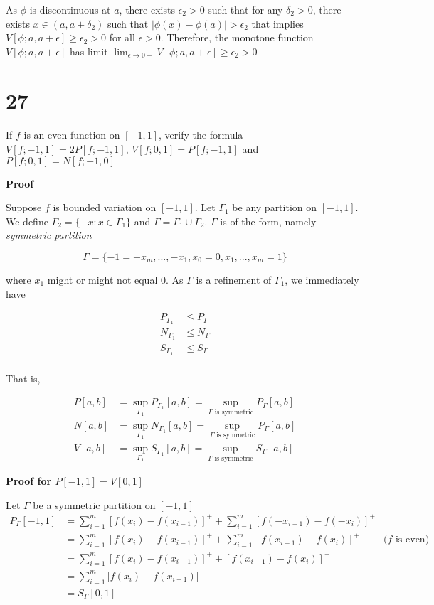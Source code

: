 \documentclass{article}
\begin{document}
As $\phi$ is discontinuous at $a$, there exists $\epsilon_2 > 0$ such that for any $\delta_2 > 0$, there exists $x \in (a, a + \delta_2)$ such that $|\phi(x) - \phi(a)| > \epsilon_2$ that implies $V[\phi; a, a+\epsilon] \geq \epsilon_2 > 0$ for all $\epsilon > 0$. Therefore, the monotone function $V[\phi; a, a+\epsilon]$ has limit $\lim_{\epsilon \to 0+} V[\phi; a, a+\epsilon] \geq \epsilon_2 > 0$





\section*{27}
If $f$ is an even function on $[-1, 1]$, verify the formula $V[f; -1, 1] = 2P[f; -1, 1]$, $V[f; 0, 1] = P[f; -1, 1]$ and $P[f; 0, 1] = N[f; -1, 0]$

\textbf{Proof}

Suppose $f$ is bounded variation on $[-1, 1]$. Let $\Gamma_1$ be any partition on $[-1, 1]$. We define $\Gamma_2 = \{ -x : x \in \Gamma_1\}$ and $\Gamma = \Gamma_1 \cup \Gamma_2$. $\Gamma$ is of the form, namely \emph{symmetric partition}

$$
\Gamma = \{-1 = -x_m, ..., -x_1, x_0 = 0, x_1, ..., x_m = 1\}
$$

where $x_1$ might or might not equal $0$. As $\Gamma$ is a refinement of $\Gamma_1$, we immediately have 

\begin{align*}
    P_{\Gamma_1} &\leq P_{\Gamma} \\
    N_{\Gamma_1} &\leq N_{\Gamma} \\
    S_{\Gamma_1} &\leq S_{\Gamma} \\
\end{align*}

That is,

\begin{align*}
    P[a, b] &= \sup_{\Gamma_1} P_{\Gamma_1}[a, b] = \sup_{\Gamma\text{ is symmetric}} P_{\Gamma}[a, b] \\
    N[a, b] &= \sup_{\Gamma_1} N_{\Gamma_1}[a, b] = \sup_{\Gamma\text{ is symmetric}} P_{\Gamma}[a, b] \\
    V[a, b] &= \sup_{\Gamma_1} S_{\Gamma_1}[a, b] = \sup_{\Gamma\text{ is symmetric}} S_{\Gamma}[a, b]
\end{align*}

\textbf{Proof for $P[-1, 1] = V[0, 1]$}

Let $\Gamma$ be a symmetric partition on $[-1, 1]$
\begin{align*}
    P_\Gamma[-1, 1]
        &= \sum_{i=1}^m [f(x_i) - f(x_{i-1})]^+ + \sum_{i=1}^m [f(-x_{i-1}) - f(-x_i)]^+ \\
        &= \sum_{i=1}^m [f(x_i) - f(x_{i-1})]^+ + \sum_{i=1}^m [f(x_{i-1}) - f(x_i)]^+ &\text{($f$ is even)} \\
        &= \sum_{i=1}^m [f(x_i) - f(x_{i-1})]^+ + [f(x_{i-1}) - f(x_i)]^+ \\
        &= \sum_{i=1}^m \left|f(x_i) - f(x_{i-1})\right| \\
        &= S_\Gamma[0, 1]
\end{align*}
\end{document}
